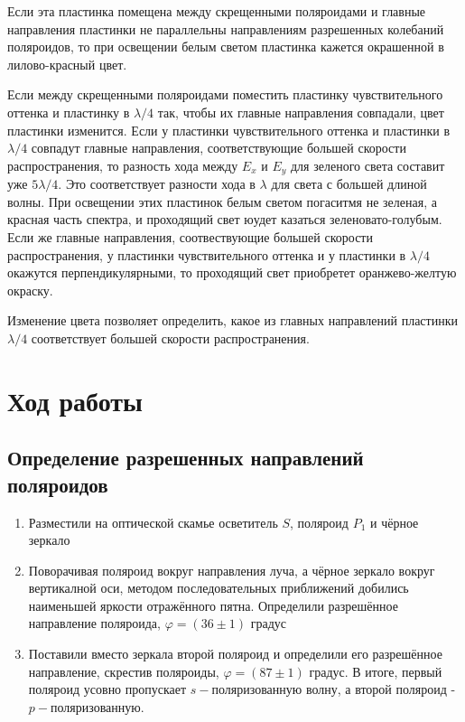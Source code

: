 \documentclass[a4paper,12pt]{article}
\begin{document}
Если эта пластинка помещена между скрещенными поляроидами и главные направления пластинки не параллельны направлениям разрешенных колебаний поляроидов, то при освещении белым светом пластинка кажется окрашенной в лилово-красный цвет. 

Если между скрещенными поляроидами поместить пластинку чувствительного оттенка и пластинку в $\lambda/4$ так, чтобы их главные направления совпадали, цвет пластинки изменится. Если у пластинки чувствительного оттенка и пластинки в $\lambda/4$ совпадут главные направления, соответствующие большей скорости распространения, то разность хода между $E_x$ и $E_y$ для зеленого света составит уже $5\lambda/4$. Это соответствует разности хода в $\lambda$ для света с большей длиной волны. При освещении этих пластинок белым светом погаситмя не зеленая, а красная часть спектра, и проходящий свет юудет казаться зеленовато-голубым. Если же главные направления, соотвествующие большей скорости распространения, у пластинки чувствительного оттенка и у пластинки в $\lambda/4$ окажутся перпендикулярными, то проходящий свет приобретет оранжево-желтую окраску. 

Изменение цвета позволяет определить, какое из главных направлений пластинки $\lambda/4$ соответствует большей скорости распространения.

\section{Ход работы}

\subsection{Определение разрешенных направлений поляроидов}
\begin{enumerate}
    \item Разместили на оптической скамье осветитель $S$, поляроид $P_1$ и чёрное зеркало

    \item Поворачивая поляроид вокруг направления луча, а чёрное зеркало вокруг вертикалной оси, методом последовательных приближений добились наименьшей яркости отражённого пятна. Определили разрешённое направление поляроида, $\varphi=(36\pm1)$ градус
    
    \item Поставили вместо зеркала второй поляроид и определили его разрешённое направление, скрестив поляроиды, $\varphi=(87\pm1)$ градус. В итоге, первый поляроид усовно пропускает $s-$поляризованную волну, а второй поляроид - $p-$поляризованную.
\end{enumerate}
\end{document}
